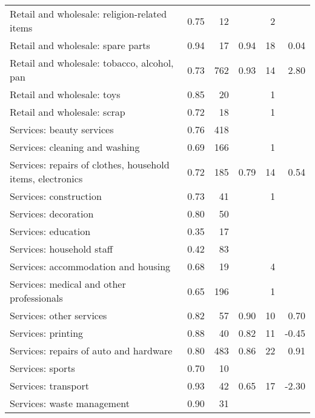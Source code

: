 \begin{longtable}{lrrrrr}
  Retail and wholesale: religion-related items & 0.75 &  12 &  &   2 &  \\ 
  Retail and wholesale: spare parts & 0.94 &  17 & 0.94 &  18 & 0.04 \\ 
  Retail and wholesale: tobacco, alcohol, pan & 0.73 & 762 & 0.93 &  14 & 2.80 \\ 
  Retail and wholesale: toys & 0.85 &  20 &  &   1 &  \\ 
  Retail and wholesale: scrap & 0.72 &  18 &  &   1 &  \\ 
  Services: beauty services & 0.76 & 418 &  &  &  \\ 
  Services: cleaning and washing & 0.69 & 166 &  &   1 &  \\ 
  Services: repairs of clothes, household items, electronics & 0.72 & 185 & 0.79 &  14 & 0.54 \\ 
  Services: construction & 0.73 &  41 &  &   1 &  \\ 
  Services: decoration & 0.80 &  50 &  &  &  \\ 
  Services: education & 0.35 &  17 &  &  &  \\ 
  Services: household staff & 0.42 &  83 &  &  &  \\ 
  Services: accommodation and housing & 0.68 &  19 &  &   4 &  \\ 
  Services: medical and other professionals & 0.65 & 196 &  &   1 &  \\ 
  Services: other services & 0.82 &  57 & 0.90 &  10 & 0.70 \\ 
  Services: printing & 0.88 &  40 & 0.82 &  11 & -0.45 \\ 
  Services: repairs of auto and hardware & 0.80 & 483 & 0.86 &  22 & 0.91 \\ 
  Services: sports & 0.70 &  10 &  &  &  \\ 
  Services: transport & 0.93 &  42 & 0.65 &  17 & -2.30 \\ 
  Services: waste management & 0.90 &  31 &  &  &  \\ 
   \hline
\hline
\end{longtable}

